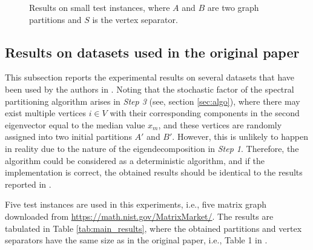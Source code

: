 \documentclass[pdftex, 12pt, a4paper]{article}
\begin{document}
\begin{figure}[t]
\begin{minipage}{0.49\textwidth}
\end{minipage}
\caption{Results on small test instances, where $A$ and $B$ are two graph partitions and $S$ is the vertex separator.}
\label{fig:result_small}
\end{figure}

\subsection{Results on datasets used in the original paper}
This subsection reports the experimental results on several datasets that have been used by the authors in \cite{pothen1990partitioning}. Noting that the stochastic factor of the spectral partitioning algorithm arises in \textit{Step 3} (see, section \ref{sec:algo}), where there may exist multiple vertices $i \in V$ with their corresponding components in the second eigenvector equal to the median value $x_m$, and these vertices are randomly assigned into two initial partitions $A'$ and $B'$. However, this is unlikely to happen in reality due to the nature of the eigendecomposition in \textit{Step 1}. Therefore, the algorithm could be considered as a deterministic algorithm, and if the implementation is correct, the obtained results should be identical to the results reported in \cite{pothen1990partitioning}.

Five test instances are used in this experiments, i.e., five matrix graph downloaded from \url{https://math.nist.gov/MatrixMarket/}. The results are tabulated in Table \ref{tab:main_results}, where the obtained partitions and vertex separators have the same size as in the original paper, i.e., Table 1 in \cite{pothen1990partitioning}. 
\end{document}
